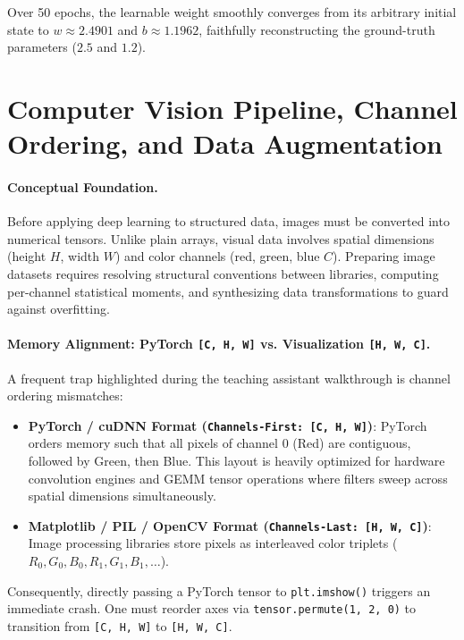 \documentclass[11pt,a4paper]{article}
\begin{document}
Over 50 epochs, the learnable weight smoothly converges from its arbitrary initial state to $w \approx 2.4901$ and $b \approx 1.1962$, faithfully reconstructing the ground-truth parameters ($2.5$ and $1.2$).

\clearpage

\section[Computer Vision Pipeline and CIFAR-10]{Computer Vision Pipeline, Channel Ordering, and Data Augmentation}

\paragraph{Conceptual Foundation.}
Before applying deep learning to structured data, images must be converted into numerical tensors. Unlike plain arrays, visual data involves spatial dimensions (height $H$, width $W$) and color channels (red, green, blue $C$). Preparing image datasets requires resolving structural conventions between libraries, computing per-channel statistical moments, and synthesizing data transformations to guard against overfitting.

\paragraph{Memory Alignment: PyTorch \texttt{[C, H, W]} vs. Visualization \texttt{[H, W, C]}.}
A frequent trap highlighted during the teaching assistant walkthrough is channel ordering mismatches:

\begin{itemize}
    \item \textbf{PyTorch / cuDNN Format (\texttt{Channels-First: [C, H, W]})}: PyTorch orders memory such that all pixels of channel 0 (Red) are contiguous, followed by Green, then Blue. This layout is heavily optimized for hardware convolution engines and GEMM tensor operations where filters sweep across spatial dimensions simultaneously.
    \item \textbf{Matplotlib / PIL / OpenCV Format (\texttt{Channels-Last: [H, W, C]})}: Image processing libraries store pixels as interleaved color triplets ($R_0, G_0, B_0, R_1, G_1, B_1, \dots$).
\end{itemize}
Consequently, directly passing a PyTorch tensor to \texttt{plt.imshow()} triggers an immediate crash. One must reorder axes via \texttt{tensor.permute(1, 2, 0)} to transition from \texttt{[C, H, W]} to \texttt{[H, W, C]}.
\end{document}
